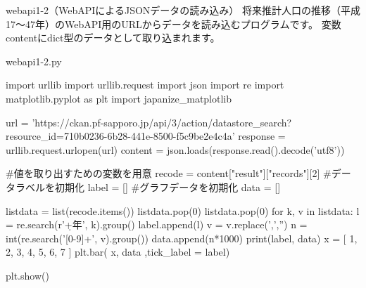\begin{pabox}{webapi1-2（WebAPIによるJSONデータの読み込み）}
将来推計人口の推移（平成17～47年）のWebAPI用のURLからデータを読み込むプログラムです。
変数contentにdict型のデータとして取り込まれます。
\begin{legbox}{webapi1-2.py}
\begin{listing}{1}
import urllib
import urllib.request
import json
import re
import matplotlib.pyplot as plt
import japanize_matplotlib

url = 'https://ckan.pf-sapporo.jp/api/3/action/datastore_search?
      resource_id=710b0236-6b28-441e-8500-f5c9be2e4c4a'
response = urllib.request.urlopen(url)
content = json.loads(response.read().decode('utf8'))

#値を取り出すための変数を用意
recode = content["result"]["records"][2]
#データラベルを初期化
label = []
#グラフデータを初期化
data = []

listdata = list(recode.items()) 
listdata.pop(0)
listdata.pop(0)
for k, v in listdata:
    l = re.search(r'\d+年', k).group()
    label.append(l)
    v = v.replace(',','')
    n = int(re.search('[0-9]+', v).group())
    data.append(n*1000)
print(label, data)
x = [ 1, 2, 3, 4, 5, 6, 7 ]
plt.bar( x, data ,tick_label = label)

plt.show()
\end{listing}
\end{legbox}
\end{pabox}
